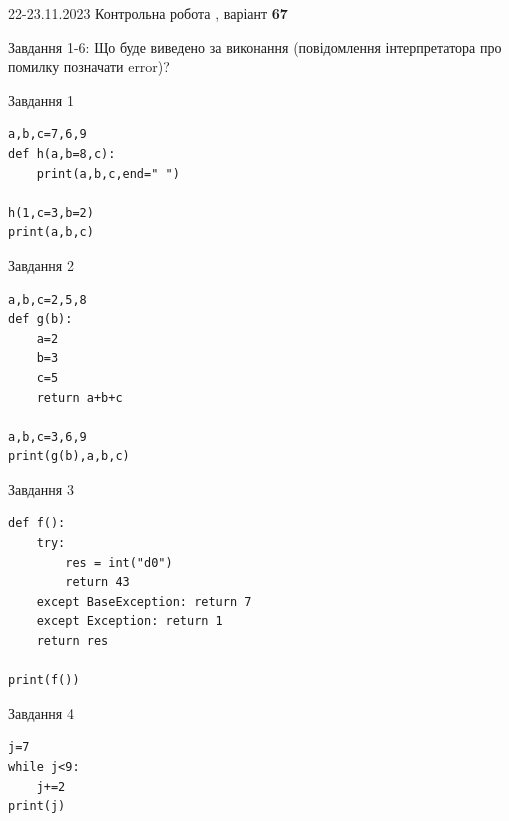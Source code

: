 \documentclass[12pt, ukrainian]{article}
\begin{document}
{{22-23.11.2023 Контрольна робота , варіант  \No \textbf { 67 }\par}}
{

Завдання 1-6: Що буде виведено за виконання (повідомлення інтерпретатора про помилку позначати error)?


\begin{minipage}[t]{9.7cm}                
{\begin{center}Завдання {1}\end{center}}
\begin{verbatim}
a,b,c=7,6,9
def h(a,b=8,c):
    print(a,b,c,end=" ")

h(1,c=3,b=2)
print(a,b,c)
\end{verbatim}     
\end{minipage}
\vline \hspace{8mm}
\begin{minipage}[t]{8.0cm}                
{\begin{center}Завдання {2}\end{center}}
\begin{verbatim}
a,b,c=2,5,8
def g(b):
    a=2
    b=3
    c=5
    return a+b+c

a,b,c=3,6,9
print(g(b),a,b,c)
\end{verbatim}     
\end{minipage}

\vspace{15mm}
\begin{minipage}[t]{9.7cm}                
{\begin{center}Завдання {3}\end{center}}
\begin{verbatim}
def f():
    try:
        res = int("d0")
        return 43
    except BaseException: return 7
    except Exception: return 1
    return res

print(f())
\end{verbatim}     
\end{minipage}
\vline \hspace{8mm}
\begin{minipage}[t]{8.0cm}                
{\begin{center}Завдання {4}\end{center}}
\begin{verbatim}
j=7
while j<9:
    j+=2
print(j)
\end{verbatim}     
\end{minipage}

}
\end{document}
